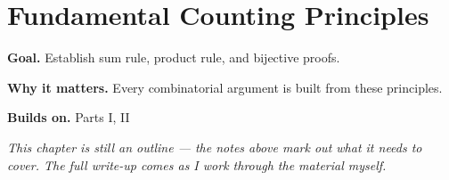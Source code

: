 \chapter{Fundamental Counting Principles}
\label{ch:06-combinatorics-and-graph-theory-01}

\begin{chapterintro}
\textbf{Goal.} Establish sum rule, product rule, and bijective proofs.

\textbf{Why it matters.} Every combinatorial argument is built from these principles.

\textbf{Builds on.} Parts I, II
\end{chapterintro}

\textit{This chapter is still an outline --- the notes above mark out what it needs to cover. The full write-up comes as I work through the material myself.}
